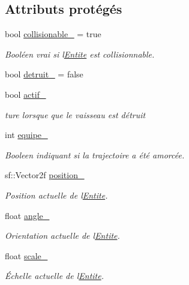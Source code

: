 \subsection*{Attributs protégés}
\begin{DoxyCompactItemize}
\item 
bool \hyperlink{class_entite_a37bb9bd568e9e1c904eaa83ec49a2b16}{collisionable\+\_\+} = true
\begin{DoxyCompactList}\small\item\em Booléen vrai si l\textquotesingle{}\hyperlink{class_entite}{Entite} est collisionnable. \end{DoxyCompactList}\item 
bool \hyperlink{class_entite_a2d98d6fac9fb85da156fcda84fcec3ac}{detruit\+\_\+} = false
\item 
bool \hyperlink{class_entite_ac8416aa3acec089b4b0daa818d62fea5}{actif\+\_\+}
\begin{DoxyCompactList}\small\item\em ture lorsque que le vaisseau est détruit \end{DoxyCompactList}\item 
int \hyperlink{class_entite_a86f42758a3e4672052331b7a4daa10b5}{equipe\+\_\+}
\begin{DoxyCompactList}\small\item\em Booleen indiquant si la trajectoire a été amorcée. \end{DoxyCompactList}\item 
sf\+::\+Vector2f \hyperlink{class_entite_abbd554c4f122159a73cb113cc8de3860}{position\+\_\+}
\begin{DoxyCompactList}\small\item\em Position actuelle de l\textquotesingle{}\hyperlink{class_entite}{Entite}. \end{DoxyCompactList}\item 
float \hyperlink{class_entite_a2d6dc6bfcee492337b7422f12b393141}{angle\+\_\+}
\begin{DoxyCompactList}\small\item\em Orientation actuelle de l\textquotesingle{}\hyperlink{class_entite}{Entite}. \end{DoxyCompactList}\item 
float \hyperlink{class_entite_a50e0f8c1188d9833432c55c7f7d2aa0f}{scale\+\_\+}
\begin{DoxyCompactList}\small\item\em Échelle actuelle de l\textquotesingle{}\hyperlink{class_entite}{Entite}. \end{DoxyCompactList}\item 

\end{DoxyCompactItemize}
